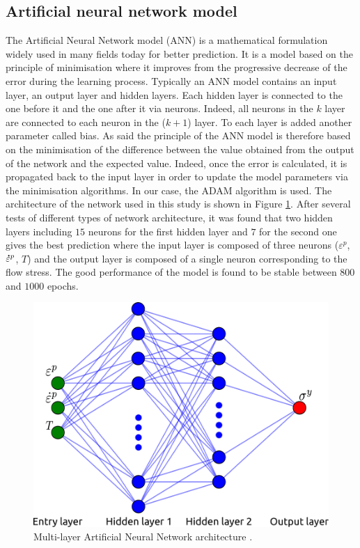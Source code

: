 \documentclass[twoside,english,1p,final,sort&compress]{elsarticle}
\theoremstyle{plain}
\newcommand{\mdot}[1]{\accentset{\mbox{\bfseries .}}{#1}}
\begin{document}
\subsection{Artificial neural network model\label{sec:ANNmodel}}
The Artificial Neural Network model (ANN) is a mathematical formulation widely used in many fields today for better prediction. It is a model based on the principle of minimisation where it improves from the progressive decrease of the error during the learning process. Typically an ANN model contains an input layer, an output layer and hidden layers. Each hidden layer is connected to the one before it and the one after it via neurons. Indeed, all neurons in the $k$ layer are connected to each neuron in the ($k+1$) layer. To each layer is added another parameter called bias. As said the principle of the ANN model is therefore based on the minimisation of the difference between the value obtained from the output of the network and the expected value.  Indeed, once the error is calculated, it is propagated back to the input layer in order to update the model parameters via the minimisation algorithms. In our case, the ADAM algorithm is used. The architecture of the network used in this study is shown in Figure \ref{fig:ANN-scheme-2HL}. After several tests of different types of network architecture, it was found that two hidden layers including $15$ neurons for the first hidden layer and $7$ for the second one gives the best prediction where the input layer is composed of three neurons ($\varepsilon^p$, $\mdot{\varepsilon}^p$, $T$) and the output layer is composed of a single neuron corresponding to the flow stress. The good performance of the model is found to be stable between $800$ and $1000$ epochs.

\begin{figure}[!ht]
\centering
\includegraphics[width=0.7\columnwidth]
{Figures/ANN-scheme-2HL}
\caption{Multi-layer Artificial Neural Network architecture \cite{Pantale-2021}.}
\label{fig:ANN-scheme-2HL}
\end{figure}
\end{document}
